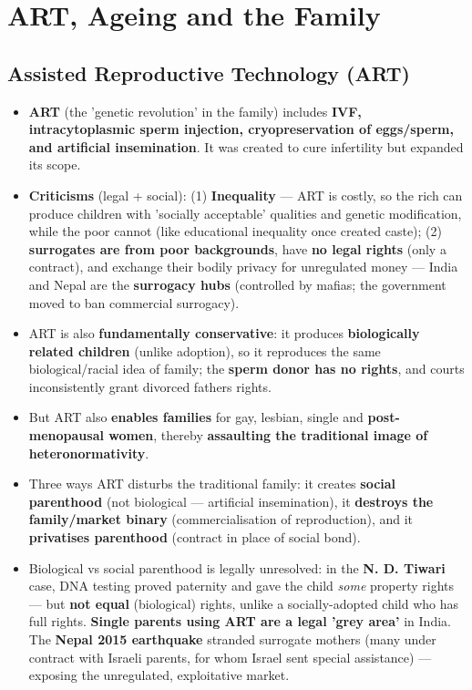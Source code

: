 \chapter{ART, Ageing and the Family}

\section{Assisted Reproductive Technology (ART)}

\begin{KeyConcept}
\begin{itemize}
\item \textbf{ART} (the 'genetic revolution' in the family) includes \textbf{IVF, intracytoplasmic sperm injection, cryopreservation of eggs/sperm, and artificial insemination}. It was created to cure infertility but expanded its scope.
\item \textbf{Criticisms} (legal + social): (1) \textbf{Inequality} --- ART is costly, so the rich can produce children with 'socially acceptable' qualities and genetic modification, while the poor cannot (like educational inequality once created caste); (2) \textbf{surrogates are from poor backgrounds}, have \textbf{no legal rights} (only a contract), and exchange their bodily privacy for unregulated money --- India and Nepal are the \textbf{surrogacy hubs} (controlled by mafias; the government moved to ban commercial surrogacy).
\item ART is also \textbf{fundamentally conservative}: it produces \textbf{biologically related children} (unlike adoption), so it reproduces the same biological/racial idea of family; the \textbf{sperm donor has no rights}, and courts inconsistently grant divorced fathers rights.
\item But ART also \textbf{enables families} for gay, lesbian, single and \textbf{post-menopausal women}, thereby \textbf{assaulting the traditional image of heteronormativity}.
\item Three ways ART disturbs the traditional family: it creates \textbf{social parenthood} (not biological --- artificial insemination), it \textbf{destroys the family/market binary} (commercialisation of reproduction), and it \textbf{privatises parenthood} (contract in place of social bond).
\item Biological vs social parenthood is legally unresolved: in the \textbf{N. D. Tiwari} case, DNA testing proved paternity and gave the child \emph{some} property rights --- but \textbf{not equal} (biological) rights, unlike a socially-adopted child who has full rights. \textbf{Single parents using ART are a legal 'grey area'} in India. The \textbf{Nepal 2015 earthquake} stranded surrogate mothers (many under contract with Israeli parents, for whom Israel sent special assistance) --- exposing the unregulated, exploitative market.

\end{itemize}
\end{KeyConcept}
